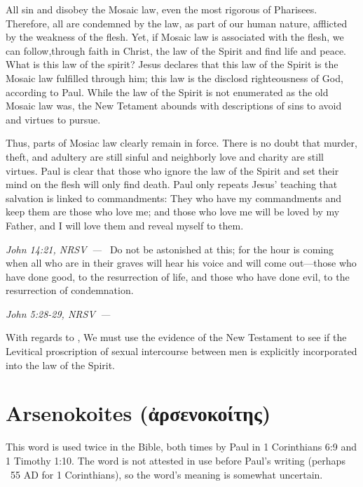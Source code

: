 \documentclass[10pt]{article}
\let\oldquote\quote
\let\endoldquote\endquote
\renewenvironment{quote}[2][]
  {\if\relax\detokenize{#1}\relax
     \def\quoteauthor{#2}%
   \else
     \def\quoteauthor{#2~---~#1}%
   \fi
   \oldquote}
  {\par\nobreak\smallskip\hfill\textit{\quoteauthor}%
   \endoldquote\addvspace{\bigskipamount}}
\begin{document}
All sin and disobey the Mosaic law, even the most rigorous of Pharisees. Therefore, all are condemned by the law, as part of our human nature, afflicted by the weakness of the flesh. Yet, if Mosaic law is associated with the flesh,  we can follow,through faith in Christ, the law of the Spirit and find life and peace. What is this law of the spirit? Jesus declares that this law of the Spirit is the Mosaic law fulfilled through him; this law is the disclosd righteousness of God, according to Paul. While the law of the Spirit is not enumerated as the old Mosaic law was, the New Tetament abounds with descriptions of sins to avoid and virtues to pursue. 

Thus, parts of Mosiac law clearly remain in force. There is no doubt that murder, theft, and adultery are still sinful and neighborly love and charity are still virtues. Paul is clear that those who ignore the law of the Spirit and set their mind on the flesh will only find death. Paul only repeats Jesus' teaching that salvation is linked to commandments:
\begin{quote}{John 14:21, NRSV}
They who have my commandments and keep them are those who love me; and those who love me will be loved by my Father, and I will love them and reveal myself to them.
\end{quote}
\begin{quote}{John 5:28-29, NRSV}
Do not be astonished at this; for the hour is coming when all who are in their graves will hear his voice and will come out—those who have done good, to the resurrection of life, and those who have done evil, to the resurrection of condemnation.
\end{quote}

With regards to , We must use the evidence of the New Testament to see if the Levitical proscription of sexual intercourse between men is explicitly incorporated into the law of the Spirit. 



\section*{Arsenokoites ({\textgreekfont ἀρσενοκοίτης)}}

This word is used twice in the Bible, both times by Paul in 1 Corinthians 6:9 and 1 Timothy 1:10. The word is not attested in use before Paul's writing (perhaps ~55 AD for 1 Corinthians), so the word's meaning is somewhat uncertain. 
\end{document}
